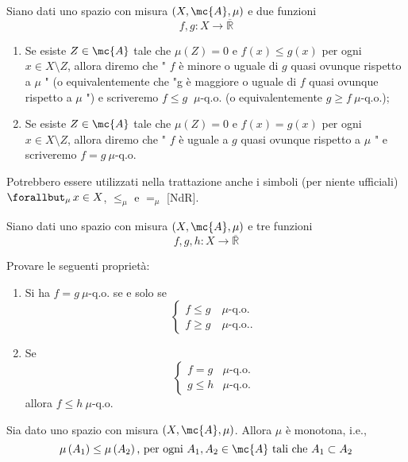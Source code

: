 \begin{boxdef}
    Siano dati uno spazio con misura $(X, \mc{A}, \mu)$ e due funzioni
    \[
    f, g: X \rightarrow \overline{\mathbb{R}}
    \]
    \begin{enumerate}[label=$(\roman*)$]
        \item Se esiste $Z \in \mc{A}$ tale che $\mu(Z)=0$ e $f(x) \leq g(x)$ per ogni $x \in X \setminus Z$, allora diremo che " $f$ è minore o uguale di $g$ quasi ovunque rispetto a $\mu$ " (o equivalentemente che "g è maggiore o uguale di $f$ quasi ovunque rispetto a $\mu$ ") e scriveremo $f \leq g$ $\ \mu$-q.o. (o equivalentemente $g \geq f \ \mu$-q.o.);
        \item Se esiste $Z \in \mc{A}$ tale che $\mu(Z)=0$ e $f(x)=g(x)$ per ogni $x \in X \setminus Z$, allora diremo che " $f$ è uguale a $g$ quasi ovunque rispetto a $\mu$ " e scriveremo $f=g \ \mu$-q.o.
    \end{enumerate}
\end{boxdef}
Potrebbero essere utilizzati nella trattazione anche i simboli (per niente ufficiali) $\operatorname{\forallbut}_\mu x \in X$, $\leq_\mu$ e $=_\mu$ [NdR].
\begin{exc}
    Siano dati uno spazio con misura $(X, \mc{A}, \mu)$ e tre funzioni
\[
f, g, h: X \rightarrow \overline{\mathbb{R}}
\]

Provare le seguenti proprietà:

\begin{enumerate}[label=$(\roman*)$]
    \item Si ha $f=g \ \mu$-q.o. se e solo se
    \[
    \left\{\begin{array}{l}
    f \leq g \quad \mu \text {-q.o. } \\
    f \geq g \quad \mu \text {-q.o.. }
    \end{array}\right.
    \]
    \item Se
    \[
    \begin{cases}f=g & \mu \text {-q.o. } \\ g \leq h & \mu \text {-q.o. }\end{cases}
    \]
    allora $f \leq h \ \mu$-q.o.
    
\end{enumerate}
\end{exc}
\begin{oss}
    Sia dato uno spazio con misura $(X, \mc{A}, \mu)$. Allora $\mu$ è monotona, i.e.,
    \[
    \mu\left(A_{1}\right) \leq \mu\left(A_{2}\right) \text {, per ogni } A_{1}, A_{2} \in \mc{A} \text { tali che } A_{1} \subset A_{2}
    \]
\end{oss}


